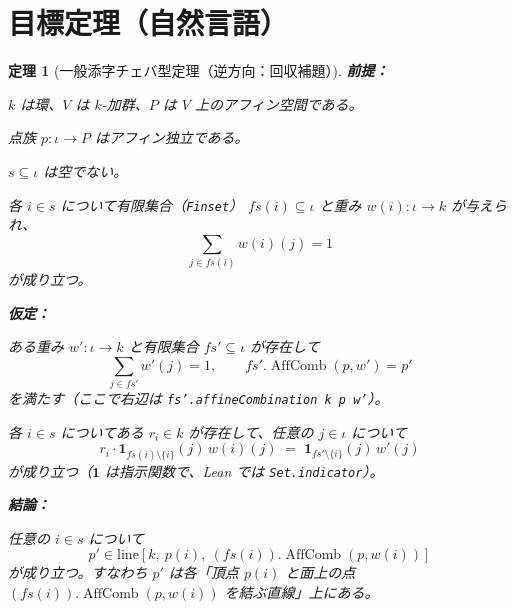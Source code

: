 \documentclass[a4paper,12pt]{bxjsbook}
\theoremstyle{theorem}
\newtheorem{theorem}{定理}[chapter]
\DeclareMathOperator{\AffComb}{AffComb}
\begin{document}
    \section{目標定理（自然言語）}\label{sec:goal-statement}
    \begin{theorem}[一般添字チェバ型定理（逆方向：回収補題）]\label{thm:ceva-converse-target}
        \noindent\textbf{前提：}\par
        \begin{theoremenumerate}[label=(P\arabic*), leftmargin=4em, topsep=2pt, partopsep=0pt, itemsep=0pt, parsep=0pt]
            \item $k$ は環、$V$ は $k$-加群、$P$ は $V$ 上のアフィン空間である。
            \item 点族 $p:\iota\to P$ はアフィン独立である。
            \item $s\subseteq \iota$ は空でない。
            \item 各 $i\in s$ について有限集合（\texttt{Finset}） $fs(i)\subseteq \iota$ と重み $w(i):\iota\to k$ が与えられ、
            \[
              \sum_{j\in fs(i)} w(i)(j)=1
            \]
            が成り立つ。
        \end{theoremenumerate}

        \noindent\textbf{仮定：}\par
        \begin{theoremenumerate}[label=(A\arabic*), leftmargin=4em, topsep=2pt, partopsep=0pt, itemsep=0pt, parsep=0pt]
            \item ある重み $w':\iota\to k$ と有限集合 $fs'\subseteq \iota$ が存在して
            \[
              \sum_{j\in fs'} w'(j)=1,\qquad fs'.\AffComb(p,w')=p'
            \]
            を満たす（ここで右辺は \texttt{fs'.affineCombination k p w'}）。
            \item 各 $i\in s$ についてある $r_i\in k$ が存在して、任意の $j\in \iota$ について
            \[
              r_i\cdot \mathbf{1}_{fs(i)\setminus\{i\}}(j)\,w(i)(j)
              \;=\;
              \mathbf{1}_{fs'\setminus\{i\}}(j)\,w'(j)
            \]
            が成り立つ（$\mathbf 1$ は指示関数で、Lean では \texttt{Set.indicator}）。
        \end{theoremenumerate}

        \noindent\textbf{結論：}\par
        \begin{theoremenumerate}[label=(C\arabic*), leftmargin=4em, topsep=2pt, partopsep=0pt, itemsep=0pt, parsep=0pt]
            \item 任意の $i\in s$ について
            \[
              p' \in \mathrm{line}\!\left[k,\ p(i),\ (fs(i)).\AffComb(p,w(i))\right]
            \]
            が成り立つ。すなわち $p'$ は各「頂点 $p(i)$ と面上の点 $(fs(i)).\AffComb(p,w(i))$ を結ぶ直線」上にある。
        \end{theoremenumerate}
    \end{theorem}
\end{document}
